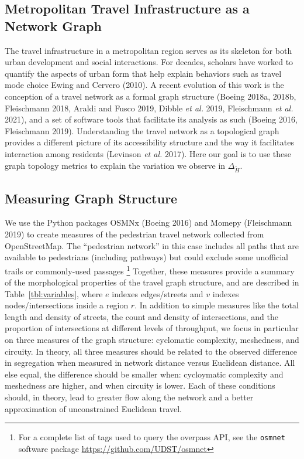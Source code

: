 \documentclass[
  10pt,
]{article}
\begin{document}
\hypertarget{metropolitan-travel-infrastructure-as-a-network-graph}{%
\subsection{Metropolitan Travel Infrastructure as a Network
Graph}\label{metropolitan-travel-infrastructure-as-a-network-graph}}

The travel infrastructure in a metropolitan region serves as its
skeleton for both urban development and social interactions. For
decades, scholars have worked to quantify the aspects of urban form that
help explain behaviors such as travel mode choice Ewing and Cervero
(2010). A recent evolution of this work is the conception of a travel
network as a formal graph structure (Boeing 2018a, 2018b, Fleischmann
2018, Araldi and Fusco 2019, Dibble \emph{et al.} 2019, Fleischmann
\emph{et al.} 2021), and a set of software tools that facilitate its
analysis as such (Boeing 2016, Fleischmann 2019). Understanding the
travel network as a topological graph provides a different picture of
its accessibility structure and the way it facilitates interaction among
residents (Levinson \emph{et al.} 2017). Here our goal is to use these
graph topology metrics to explain the variation we observe in
\(\Delta_{\tilde{H}}\).

\hypertarget{measuring-graph-structure}{%
\subsection{Measuring Graph Structure}\label{measuring-graph-structure}}

We use the Python packages OSMNx (Boeing 2016) and Momepy (Fleischmann
2019) to create measures of the pedestrian travel network collected from
OpenStreetMap. The ``pedestrian network'' in this case includes all
paths that are available to pedestrians (including pathways) but could
exclude some unofficial trails or commonly-used passages \footnote{For a
  complete list of tags used to query the overpass API, see the
  \texttt{osmnet} software package \url{https://github.com/UDST/osmnet}}
Together, these measures provide a summary of the morphological
properties of the travel graph structure, and are described in
Table~\ref{tbl:variables}, where \(e\) indexes edges/streets and \(v\)
indexes nodes/intersections inside a region \(r\). In addition to simple
measures like the total length and density of streets, the count and
density of intersections, and the proportion of intersections at
different levels of throughput, we focus in particular on three measures
of the graph structure: cyclomatic complexity, meshedness, and circuity.
In theory, all three measures should be related to the observed
difference in segregation when measured in network distance versus
Euclidean distance. All else equal, the difference should be smaller
when: cycloymatic complexity and meshedness are higher, and when
circuity is lower. Each of these conditions should, in theory, lead to
greater flow along the network and a better approximation of
unconstrained Euclidean travel.
\end{document}
